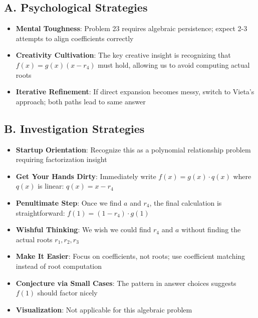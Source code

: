\documentclass[]{article}
\begin{document}
\begin{strategicbox}
\subsection*{A. Psychological Strategies}
\begin{itemize}[leftmargin=*]
    \item \textbf{Mental Toughness}: Problem 23 requires algebraic persistence; expect 2-3 attempts to align coefficients correctly
    \item \textbf{Creativity Cultivation}: The key creative insight is recognizing that $f(x) = g(x)(x-r_4)$ must hold, allowing us to avoid computing actual roots
    \item \textbf{Iterative Refinement}: If direct expansion becomes messy, switch to Vieta's approach; both paths lead to same answer
\end{itemize}

\subsection*{B. Investigation Strategies}
\begin{itemize}[leftmargin=*]
    \item \textbf{Startup Orientation}: Recognize this as a polynomial relationship problem requiring factorization insight
    
    \item \textbf{Get Your Hands Dirty}: Immediately write $f(x) = g(x) \cdot q(x)$ where $q(x)$ is linear: $q(x) = x - r_4$
    
    \item \textbf{Penultimate Step}: Once we find $a$ and $r_4$, the final calculation is straightforward: $f(1) = (1-r_4) \cdot g(1)$
    
    \item \textbf{Wishful Thinking}: We wish we could find $r_4$ and $a$ without finding the actual roots $r_1, r_2, r_3$
    
    \item \textbf{Make It Easier}: Focus on coefficients, not roots; use coefficient matching instead of root computation
    
    \item \textbf{Conjecture via Small Cases}: The pattern in answer choices suggests $f(1)$ should factor nicely
    
    \item \textbf{Visualization}: Not applicable for this algebraic problem
\end{itemize}


\end{strategicbox}
\end{document}
